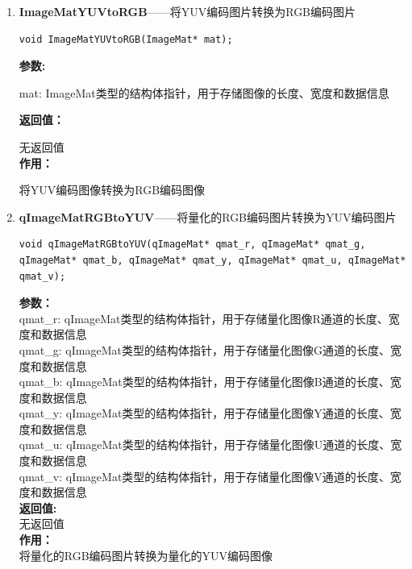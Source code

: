\documentclass[12pt, a4paper, oneside]{ctexbook}
\begin{document}
\begin{enumerate}
			\item \textbf{ImageMatYUVtoRGB}——将YUV编码图片转换为RGB编码图片
			\begin{lstlisting}[numbers=none]
void ImageMatYUVtoRGB(ImageMat* mat);
			\end{lstlisting}
			\textbf{参数:} \par mat: ImageMat类型的结构体指针，用于存储图像的长度、宽度和数据信息\par 
			\textbf{返回值：}\par 无返回值 \\
			\textbf{作用：}\par  将YUV编码图像转换为RGB编码图像\\
			\item \textbf{qImageMatRGBtoYUV}——将量化的RGB编码图片转换为YUV编码图片
			\begin{lstlisting}[numbers=none]
void qImageMatRGBtoYUV(qImageMat* qmat_r, qImageMat* qmat_g, qImageMat* qmat_b, qImageMat* qmat_y, qImageMat* qmat_u, qImageMat* qmat_v);
			\end{lstlisting}
			\textbf{参数：} \\
			qmat\_r: qImageMat类型的结构体指针，用于存储量化图像R通道的长度、宽度和数据信息 \\ 
			qmat\_g: qImageMat类型的结构体指针，用于存储量化图像G通道的长度、宽度和数据信息 \\ 
			qmat\_b: qImageMat类型的结构体指针，用于存储量化图像B通道的长度、宽度和数据信息 \\ 
			qmat\_y: qImageMat类型的结构体指针，用于存储量化图像Y通道的长度、宽度和数据信息 \\ 
			qmat\_u: qImageMat类型的结构体指针，用于存储量化图像U通道的长度、宽度和数据信息 \\
			qmat\_v: qImageMat类型的结构体指针，用于存储量化图像V通道的长度、宽度和数据信息 \\
			\textbf{返回值:} \\ 无返回值 \\
			\textbf{作用：} \\ 将量化的RGB编码图片转换为量化的YUV编码图像
			

\end{enumerate}
\end{document}
